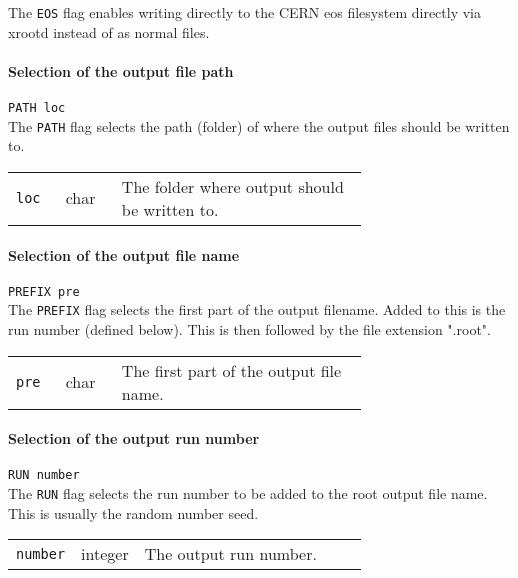 The \texttt{EOS} flag enables writing directly to the CERN eos filesystem directly via xrootd instead of as normal files.

\bigskip
\paragraph{Selection of the output file path} \texttt{PATH loc}\\

The \texttt{PATH} flag selects the path (folder) of where the output files should be written to. 

\bigskip
\begin{tabular}{@{}llp{0.7\linewidth}}
    \texttt{loc} & char    & The folder where output should be written to.
\end{tabular}

\bigskip
\paragraph{Selection of the output file name} \texttt{PREFIX pre}\\

The \texttt{PREFIX} flag selects the first part of the output filename.
Added to this is the run number (defined below).
This is then followed by the file extension ".root".

\bigskip
\begin{tabular}{@{}llp{0.7\linewidth}}
    \texttt{pre} & char    & The first part of the output file name.
\end{tabular}

\bigskip
\paragraph{Selection of the output run number} \texttt{RUN number}\\

The \texttt{RUN} flag selects the run number to be added to the root output file name. 
This is usually the random number seed.

\bigskip
\begin{tabular}{@{}llp{0.7\linewidth}}
    \texttt{number} & integer    & The output run number.
\end{tabular}

